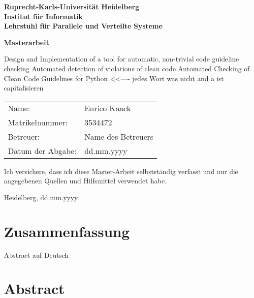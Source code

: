\documentclass[
     12pt,                    %
     a4paper,             %
     BCOR10mm,     %
     DIV14,                 %
     listof=totoc,                    %
     bibliography=totoc,       %
     index=totoc,              %
     twoside,
     headsepline
     ]{scrreprt}
\begin{document}
\begin{titlepage}


\vspace*{1cm}
\begin{center}
\vspace*{3cm}
\textbf{ 
\Large Ruprecht-Karls-Universität Heidelberg\\
\smallskip
\Large Institut für Informatik\\
\smallskip
\Large Lehrstuhl für Parallele und Verteilte Systeme\\
\smallskip
}

\vspace{3cm}

\textbf{\large Masterarbeit} 

\vspace{0.5\baselineskip}
{\huge
Design and Implementation of a tool for automatic, non-trivial code guideline checking
Automated detection of violations of clean code
Automated Checking of Clean Code Guidelines for Python <<---- jedes Wort was nicht and a ist capitalisieren
}
\end{center}

\vfill 

{\large
\begin{tabular}[l]{ll}
Name: & Enrico Kaack\\
Matrikelnummer: & 3534472\\
Betreuer: & Name des Betreuers\\
Datum der Abgabe: & dd.mm.yyyy
\end{tabular}
}

\end{titlepage}

\onehalfspacing

\thispagestyle{empty}

\vspace*{100pt}
\noindent
Ich versichere, dass ich diese Master-Arbeit selbstständig verfasst und nur die angegebenen
Quellen und Hilfsmittel verwendet habe.

\vspace*{50pt}

\noindent
Heidelberg, dd.mm.yyyy
\cleardoublepage

\section*{Zusammenfassung}

Abstract auf Deutsch

\section*{Abstract}
\end{document}
